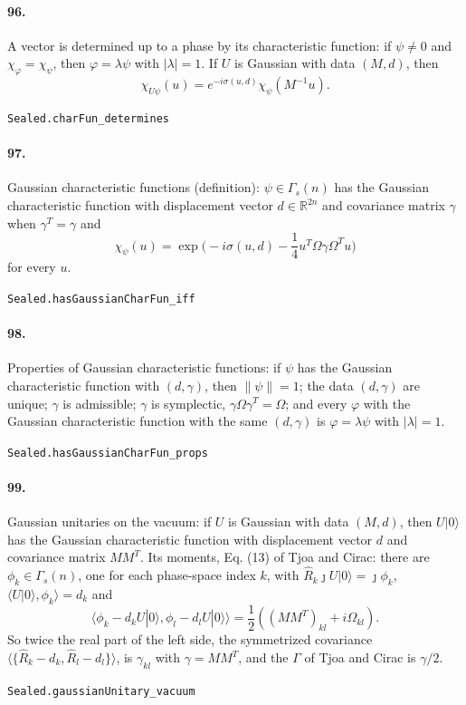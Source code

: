 \documentclass[11pt]{article}
\begin{document}
\paragraph{96.} A vector is determined up to a phase by its characteristic function: if $\psi \ne 0$ and $\chi_\varphi = \chi_\psi$, then $\varphi = \lambda\psi$ with $|\lambda| = 1$. If $U$ is Gaussian with data $(M, d)$, then \[\chi_{U\psi}(u) = e^{-i\sigma(u, d)} \chi_\psi(M^{-1}u).\]\par{\footnotesize\texttt{Sealed.charFun\_determines}}

\paragraph{97.} Gaussian characteristic functions (definition): $\psi \in \Gamma_s(n)$ has the Gaussian characteristic function with displacement vector $d \in \mathbb R^{2n}$ and covariance matrix $\gamma$ when $\gamma^T = \gamma$ and \[\chi_\psi(u) = \exp\big(-i\sigma(u, d) - \frac14 u^T \Omega \gamma \Omega^T u\big)\] for every $u$.\par{\footnotesize\texttt{Sealed.hasGaussianCharFun\_iff}}

\paragraph{98.} Properties of Gaussian characteristic functions: if $\psi$ has the Gaussian characteristic function with $(d, \gamma)$, then $\|\psi\| = 1$; the data $(d, \gamma)$ are unique; $\gamma$ is admissible; $\gamma$ is symplectic, $\gamma \Omega \gamma^T = \Omega$; and every $\varphi$ with the Gaussian characteristic function with the same $(d, \gamma)$ is $\varphi = \lambda\psi$ with $|\lambda| = 1$.\par{\footnotesize\texttt{Sealed.hasGaussianCharFun\_props}}

\paragraph{99.} Gaussian unitaries on the vacuum: if $U$ is Gaussian with data $(M, d)$, then $U|0\rangle$ has the Gaussian characteristic function with displacement vector $d$ and covariance matrix $M M^T$. Its moments, Eq. (13) of Tjoa and Cirac: there are $\phi_k \in \Gamma_s(n)$, one for each phase-space index $k$, with $\hat R_k \jmath U|0\rangle = \jmath\phi_k$, $\langle U|0\rangle, \phi_k\rangle = d_k$ and \[\langle \phi_k - d_k U|0\rangle, \phi_l - d_l U|0\rangle\rangle = \frac12 ((M M^T)_{kl} + i\Omega_{kl}).\] So twice the real part of the left side, the symmetrized covariance $\langle\{\hat R_k - d_k, \hat R_l - d_l\}\rangle$, is $\gamma_{kl}$ with $\gamma = M M^T$, and the $\Gamma$ of Tjoa and Cirac is $\gamma/2$.\par{\footnotesize\texttt{Sealed.gaussianUnitary\_vacuum}}
\end{document}
